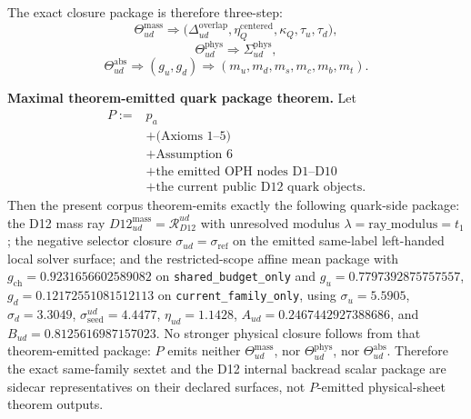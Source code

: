 The exact closure package is therefore three-step:
\[
\Theta_{ud}^{\mathrm{mass}}
\Longrightarrow
\bigl(\Delta_{ud}^{\mathrm{overlap}},\eta_Q^{\mathrm{centered}},\kappa_Q,\tau_u,\tau_d\bigr),
\]
\[
\Theta_{ud}^{\mathrm{phys}}
\Longrightarrow
\Sigma_{ud}^{\mathrm{phys}},
\]
\[
\Theta_{ud}^{\mathrm{abs}}
\Longrightarrow
(g_u,g_d)
\Longrightarrow
(m_u,m_d,m_s,m_c,m_b,m_t).
\]

\textbf{Maximal theorem-emitted quark package theorem.} Let
\[
\begin{aligned}
P:={}&p_a\\
&+\text{(Axioms 1--5)}\\
&+\text{Assumption 6}\\
&+\text{the emitted OPH nodes D1--D10}\\
&+\text{the current public D12 quark objects}.
\end{aligned}
\]
Then the present corpus theorem-emits exactly the following quark-side package: the D12 mass ray \(D12_{ud}^{\mathrm{mass}}=\mathcal R_{D12}^{ud}\) with unresolved modulus \(\lambda=\mathrm{ray\_modulus}=t_1\); the negative selector closure \(\sigma_{ud}=\sigma_{\mathrm{ref}}\) on the emitted same-label left-handed local solver surface; and the restricted-scope affine mean package with \(g_{\mathrm{ch}}=0.9231656602589082\) on \texttt{shared\_budget\_only} and \(g_u=0.7797392875757557\), \(g_d=0.12172551081512113\) on \texttt{current\_family\_only}, using \(\sigma_u=5.5905\), \(\sigma_d=3.3049\), \(\sigma_{\mathrm{seed}}^{ud}=4.4477\), \(\eta_{ud}=1.1428\), \(A_{ud}=0.2467442927388686\), and \(B_{ud}=0.8125616987157023\). No stronger physical closure follows from that theorem-emitted package: \(P\) emits neither \(\Theta_{ud}^{\mathrm{mass}}\), nor \(\Theta_{ud}^{\mathrm{phys}}\), nor \(\Theta_{ud}^{\mathrm{abs}}\). Therefore the exact same-family sextet and the D12 internal backread scalar package are sidecar representatives on their declared surfaces, not \(P\)-emitted physical-sheet theorem outputs.

